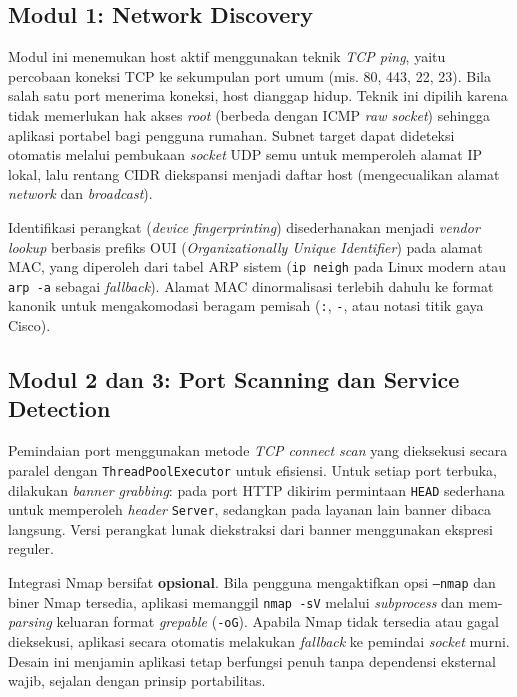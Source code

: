 \subsection{Modul 1: Network Discovery}
Modul ini menemukan host aktif menggunakan teknik \textit{TCP ping}, yaitu
percobaan koneksi TCP ke sekumpulan port umum (mis. 80, 443, 22, 23). Bila
salah satu port menerima koneksi, host dianggap hidup. Teknik ini dipilih
karena tidak memerlukan hak akses \textit{root} (berbeda dengan ICMP
\textit{raw socket}) sehingga aplikasi portabel bagi pengguna rumahan.
Subnet target dapat dideteksi otomatis melalui pembukaan \textit{socket}
UDP semu untuk memperoleh alamat IP lokal, lalu rentang CIDR diekspansi
menjadi daftar host (mengecualikan alamat \textit{network} dan
\textit{broadcast}).

Identifikasi perangkat (\textit{device fingerprinting}) disederhanakan
menjadi \textit{vendor lookup} berbasis prefiks OUI (\textit{Organizationally
Unique Identifier}) pada alamat MAC, yang diperoleh dari tabel ARP sistem
(\texttt{ip neigh} pada Linux modern atau \texttt{arp -a} sebagai
\textit{fallback}). Alamat MAC dinormalisasi terlebih dahulu ke format
kanonik untuk mengakomodasi beragam pemisah (\texttt{:}, \texttt{-}, atau
notasi titik gaya Cisco).

\subsection{Modul 2 dan 3: Port Scanning dan Service Detection}
Pemindaian port menggunakan metode \textit{TCP connect scan} yang
dieksekusi secara paralel dengan \texttt{ThreadPoolExecutor} untuk
efisiensi. Untuk setiap port terbuka, dilakukan \textit{banner grabbing}:
pada port HTTP dikirim permintaan \texttt{HEAD} sederhana untuk memperoleh
\textit{header} \texttt{Server}, sedangkan pada layanan lain banner dibaca
langsung. Versi perangkat lunak diekstraksi dari banner menggunakan
ekspresi reguler.

Integrasi Nmap bersifat \textbf{opsional}. Bila pengguna mengaktifkan opsi
\texttt{--nmap} dan biner Nmap tersedia, aplikasi memanggil
\texttt{nmap -sV} melalui \textit{subprocess} dan mem-\textit{parsing}
keluaran format \textit{grepable} (\texttt{-oG}). Apabila Nmap tidak
tersedia atau gagal dieksekusi, aplikasi secara otomatis melakukan
\textit{fallback} ke pemindai \textit{socket} murni. Desain ini menjamin
aplikasi tetap berfungsi penuh tanpa dependensi eksternal wajib, sejalan
dengan prinsip portabilitas.

